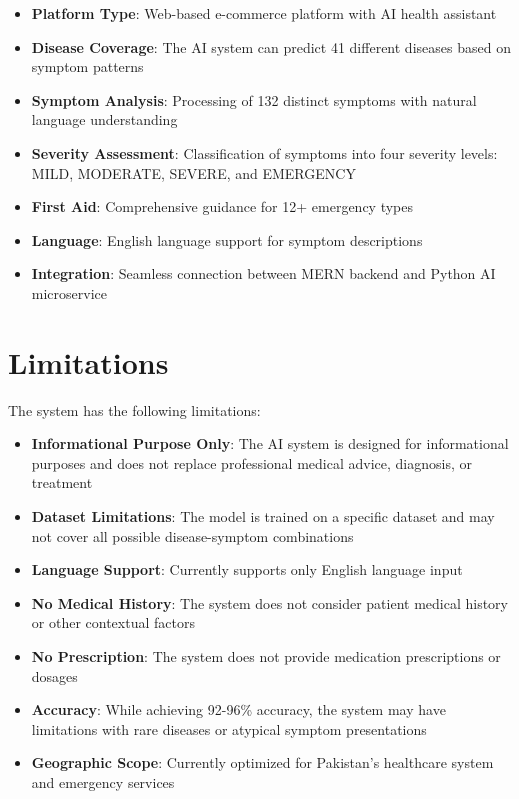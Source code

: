 \documentclass[12pt,a4paper]{article}
\begin{document}
\begin{itemize}
    \item \textbf{Platform Type}: Web-based e-commerce platform with AI health assistant
    \item \textbf{Disease Coverage}: The AI system can predict 41 different diseases based on symptom patterns
    \item \textbf{Symptom Analysis}: Processing of 132 distinct symptoms with natural language understanding
    \item \textbf{Severity Assessment}: Classification of symptoms into four severity levels: MILD, MODERATE, SEVERE, and EMERGENCY
    \item \textbf{First Aid}: Comprehensive guidance for 12+ emergency types
    \item \textbf{Language}: English language support for symptom descriptions
    \item \textbf{Integration}: Seamless connection between MERN backend and Python AI microservice
\end{itemize}

\section{Limitations}
The system has the following limitations:

\begin{itemize}
    \item \textbf{Informational Purpose Only}: The AI system is designed for informational purposes and does not replace professional medical advice, diagnosis, or treatment
    \item \textbf{Dataset Limitations}: The model is trained on a specific dataset and may not cover all possible disease-symptom combinations
    \item \textbf{Language Support}: Currently supports only English language input
    \item \textbf{No Medical History}: The system does not consider patient medical history or other contextual factors
    \item \textbf{No Prescription}: The system does not provide medication prescriptions or dosages
    \item \textbf{Accuracy}: While achieving 92-96\% accuracy, the system may have limitations with rare diseases or atypical symptom presentations
    \item \textbf{Geographic Scope}: Currently optimized for Pakistan's healthcare system and emergency services
\end{itemize}
\end{document}
